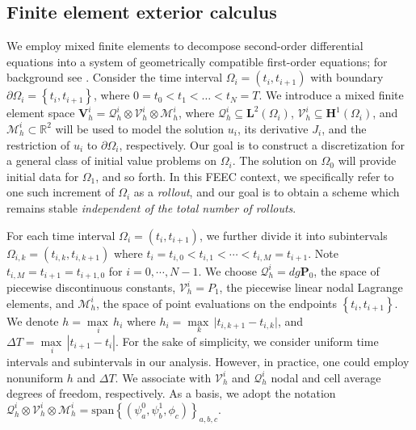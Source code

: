 \documentclass[12pt]{article}
\begin{document}
\subsection{Finite element exterior calculus}
We employ mixed finite elements to decompose second-order differential equations into a system of geometrically compatible first-order equations; for background see \cite{arnold2018finite,bochev2006principles}.
Consider the time interval $\Omega_i = \left(t_i,t_{i+1}\right)$ with boundary $\partial \Omega_i = \left\{t_i,t_{i+1}\right\}$, where $0 = t_0 < t_1 < \dots < t_N = T$. We introduce a mixed finite element space $\mathbf{V}^i_h = \mathcal{Q}^i_h \otimes \mathcal{V}^i_h \otimes \mathcal{M}^i_h$, where $\mathcal{Q}^i_h \subseteq \mathbf{L}^2(\Omega_i)$, $\mathcal{V}^i_h \subseteq \mathbf{H}^1(\Omega_i)$, and $\mathcal{M}^i_h \subset \mathbb{R}^2$ will be used to model the solution $u_i$, its derivative ${J}_i$, and the restriction of $u_i$ to $\partial \Omega_i$, respectively. Our goal is to construct a discretization for a general class of initial value problems on $\Omega_i$. The solution on $\Omega_0$ will provide initial data for $\Omega_1$, and so forth. In this FEEC context, we specifically refer to one such increment of $\Omega_i$ as a \textit{rollout}, and our goal is to obtain a scheme which remains stable \textit{independent of the total number of rollouts}.

For each time interval $\Omega_i = (t_i, t_{i+1})$, we further divide it into subintervals $\Omega_{i,k} = (t_{i,k}, t_{i,k+1})$ where $t_i = t_{i,0} < t_{i,1} < \cdots < t_{i, M} = t_{i+1}$. Note $t_{i, M} = t_{i+1} = t_{i+1,0}$ for $i = 0, \cdots, N-1$.   We choose $\mathcal{Q}^i_h = dg\mathbf{P}_0$, the space of piecewise discontinuous constants, $\mathcal{V}^i_h = P_1$,  the piecewise linear nodal Lagrange elements, and $\mathcal{M}^i_h$, the space of point evaluations on the endpoints $\left\{t_i,t_{i+1}\right\}$.  We denote $h = \underset{i}{\max \,}{h_i}$ where $h_i = \underset{k}{\max \,}{|t_{i,k+1}- t_{i,k}}|$, and $\Delta T = \underset{i}{\max \,} |t_{i+1} - t_i|$. For the sake of simplicity, we consider uniform time intervals and subintervals in our analysis.  However, in practice, one could employ nonuniform $h$ and $\Delta T$. We associate with $\mathcal{V}^i_h$ and $\mathcal{Q}^i_h$ nodal and cell average degrees of freedom, respectively. As a basis, we adopt the notation $\mathcal{Q}^i_h \otimes \mathcal{V}^i_h \otimes \mathcal{M}^i_h = \text{span} \left\{ (\psi^0_a,\psi^1_b,\phi_c) \right\}_{a,b,c}$.
\end{document}
